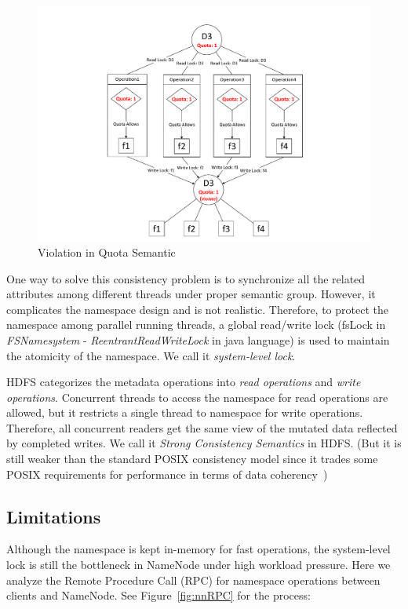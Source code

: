 \begin{figure}[h]
	\centering
	\includegraphics[scale=0.7]{figs/hdfsquota.pdf}
	\caption{Violation in Quota Semantic}
	\label{fig:hdfsquota}
\end{figure}

\noindent One way to solve this consistency problem is to synchronize all the related attributes among different threads under proper semantic group. However, it complicates the namespace design and is not realistic. Therefore, to protect the namespace among parallel running threads, a global read/write lock (fsLock in \textit{FSNamesystem} - \textit{ReentrantReadWriteLock} in java language) is used to maintain the atomicity of the namespace. We call it \textit{system-level lock}.

\noindent HDFS categorizes the metadata operations into \textit{read operations} and \textit{write operations}. Concurrent threads to access the namespace for read operations are allowed, but it restricts a single thread to namespace for write operations. Therefore, all concurrent readers get the same view of the mutated data reflected by completed writes. We call it \textit{Strong Consistency Semantics} in HDFS. (But it is still weaker than the standard POSIX consistency model since it trades some POSIX requirements for performance in terms of data coherency~\cite{white2012hadoop})

\subsection{Limitations}
\label{subsec:rpc}

\noindent Although the namespace is kept in-memory for fast operations, the system-level lock is still the bottleneck in NameNode under high workload pressure. Here we analyze the Remote Procedure Call (RPC) for namespace operations between clients and NameNode. See Figure~\ref{fig:nnRPC} for the process:

